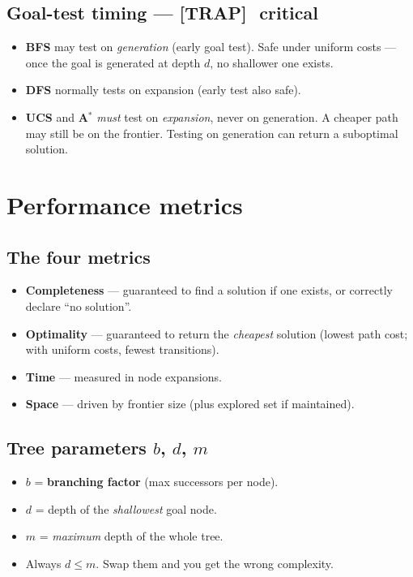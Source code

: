 \documentclass[11pt, a4paper]{article}
\newcommand{\trapflag}{\textcolor{trapBd}{\textbf{[TRAP]}}\,}
\begin{document}
\subsection{Goal-test timing — \trapflag\ critical}

\begin{itemize}
  \item \textbf{BFS} may test on \emph{generation} (early goal test). Safe under uniform costs --- once the goal is generated at depth $d$, no shallower one exists.
  \item \textbf{DFS} normally tests on expansion (early test also safe).
  \item \textbf{UCS} and \textbf{A$^{*}$} \emph{must} test on \emph{expansion}, never on generation. A cheaper path may still be on the frontier. Testing on generation can return a suboptimal solution.
\end{itemize}

\section{Performance metrics}

\subsection{The four metrics}

\begin{itemize}
  \item \textbf{Completeness} --- guaranteed to find a solution if one exists, or correctly declare ``no solution''.
  \item \textbf{Optimality} --- guaranteed to return the \emph{cheapest} solution (lowest path cost; with uniform costs, fewest transitions).
  \item \textbf{Time} --- measured in node expansions.
  \item \textbf{Space} --- driven by frontier size (plus explored set if maintained).
\end{itemize}

\subsection{Tree parameters $b$, $d$, $m$}

\begin{itemize}
  \item $b$ = \textbf{branching factor} (max successors per node).
  \item $d$ = depth of the \emph{shallowest} goal node.
  \item $m$ = \emph{maximum} depth of the whole tree.
  \item Always $d \le m$. Swap them and you get the wrong complexity.
\end{itemize}
\end{document}
